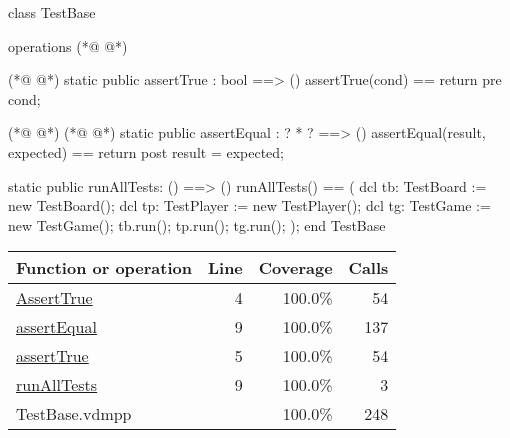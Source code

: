 \begin{vdmpp}[breaklines=true]
class TestBase

operations
(*@
\label{AssertTrue:4}
@*)
 
(*@
\label{assertTrue:5}
@*)
 static public assertTrue : bool ==> ()
  assertTrue(cond) == return
 pre cond;
  
(*@
\label{assertEqual:9}
@*)
(*@
\label{runAllTests:9}
@*)
 static public assertEqual : ? * ? ==> ()
  assertEqual(result, expected) == return
 post result = expected;
  
 static public runAllTests: () ==> ()
  runAllTests() == (
    dcl tb: TestBoard := new TestBoard();
    dcl tp: TestPlayer := new TestPlayer();
    dcl tg: TestGame := new TestGame();
    tb.run();
    tp.run();
    tg.run();
    );
end TestBase
\end{vdmpp}
\bigskip
\begin{longtable}{|l|r|r|r|}
\hline
Function or operation & Line & Coverage & Calls \\
\hline
\hline
\hyperref[AssertTrue:4]{AssertTrue} & 4&100.0\% & 54 \\
\hline
\hyperref[assertEqual:9]{assertEqual} & 9&100.0\% & 137 \\
\hline
\hyperref[assertTrue:5]{assertTrue} & 5&100.0\% & 54 \\
\hline
\hyperref[runAllTests:9]{runAllTests} & 9&100.0\% & 3 \\
\hline
\hline
TestBase.vdmpp & & 100.0\% & 248 \\
\hline
\end{longtable}


